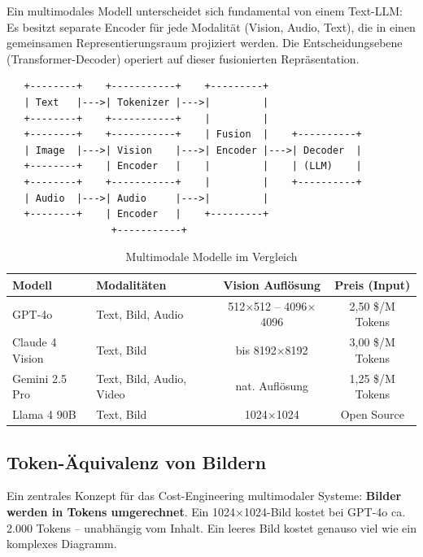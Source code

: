 Ein multimodales Modell unterscheidet sich fundamental von einem Text-LLM: Es besitzt separate Encoder für jede Modalität (Vision, Audio, Text), die in einen gemeinsamen Representierungsraum projiziert werden. Die Entscheidungsebene (Transformer-Decoder) operiert auf dieser fusionierten Repräsentation.

\begin{verbatim}
   +--------+    +-----------+    +---------+
   | Text   |--->| Tokenizer |--->|         |
   +--------+    +-----------+    |         |
   +--------+    +-----------+    | Fusion  |    +----------+
   | Image  |--->| Vision    |--->| Encoder |--->| Decoder  |
   +--------+    | Encoder   |    |         |    | (LLM)    |
   +--------+    +-----------+    |         |    +----------+
   | Audio  |--->| Audio     |--->|         |
   +--------+    | Encoder   |    +---------+
                  +-----------+
\end{verbatim}

\begin{table}[H]
\centering
\begin{tabularx}{\linewidth}{lXcc}
\toprule
\textbf{Modell} & \textbf{Modalitäten} & \textbf{Vision Auflösung} & \textbf{Preis (Input)} \\
\midrule
GPT-4o & Text, Bild, Audio & 512$\times$512 -- 4096$\times$4096 & 2,50 \$/M Tokens \\
Claude 4 Vision & Text, Bild & bis 8192$\times$8192 & 3,00 \$/M Tokens \\
Gemini 2.5 Pro & Text, Bild, Audio, Video & nat. Auflösung & 1,25 \$/M Tokens \\
Llama 4 90B & Text, Bild & 1024$\times$1024 & Open Source \\
\bottomrule
\end{tabularx}
\caption{Multimodale Modelle im Vergleich}
\label{tab:multimodalmodels}
\end{table}

\subsection{Token-Äquivalenz von Bildern}

Ein zentrales Konzept für das Cost-Engineering multimodaler Systeme: \textbf{Bilder werden in Tokens umgerechnet}. Ein 1024$\times$1024-Bild kostet bei GPT-4o ca. 2.000 Tokens -- unabhängig vom Inhalt. Ein leeres Bild kostet genauso viel wie ein komplexes Diagramm.

